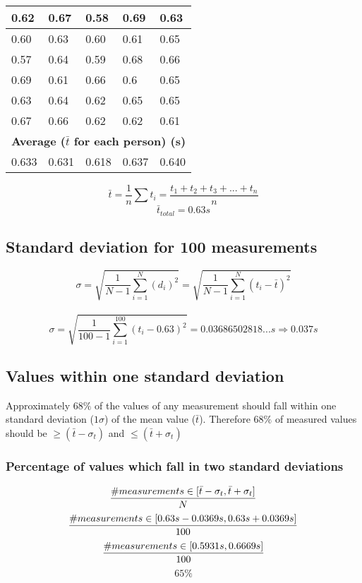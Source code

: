 \documentclass[11pt, letterpaper, includehead]{article}
\begin{document}
\begin{center}
\begin{tabular}{|  m{2cm} | m{2cm} | m{2cm} | m{2cm} | m{2cm} | }
    0.62          & 0.67           & 0.58         & 0.69           & 0.63          \\
    \hline
    0.60          & 0.63           & 0.60         & 0.61           & 0.65          \\
    \hline
    0.57          & 0.64           & 0.59         & 0.68           & 0.66          \\
    \hline
    0.69          & 0.61           & 0.66         & 0.6            & 0.65          \\
    \hline
    0.63          & 0.64           & 0.62         & 0.65           & 0.65          \\
    \hline
    0.67          & 0.66           & 0.62         & 0.62           & 0.61          \\
    \hline\hline
    \multicolumn{5}{|c|}{\textbf{Average ($\bar{t}$ for each person) (s)}} \\
    \hline
    0.633         & 0.631          & 0.618        & 0.637          & 0.640         \\
    \hline
  \end{tabular}
\end{center}
$$\bar{t} = \frac{1}{n}\sum t_i = \frac{t_1 + t_2 + t_3 + ... + t_n}{n}$$
$$\bar{t}_{total} = \boxed{0.63s}$$

\subsection{Standard deviation for 100 measurements} %
$$\sigma = \sqrt{\frac{1}{N - 1}\sum_{i = 1}^{N} (d_i)^2} = \sqrt{\frac{1}{N - 1}\sum_{i = 1}^{N} (t_i - \bar{t})^2}$$\\
$$\sigma = \sqrt{\frac{1}{100 - 1}\sum_{i = 1}^{100}(t_i - 0.63)^2} = 0.03686502818...s \Rightarrow \boxed{0.037s}$$

\subsection{Values within one standard deviation} %
Approximately $68\%$ of the values of any measurement should fall within one
standard deviation ($1 \sigma$) of the mean value ($\bar{t}$). Therefore $68\%$ of measured
values should be $\geq (\bar{t} - \sigma_t)$ and $\leq (\bar{t} + \sigma_t)$

\subsubsection{Percentage of values which fall in two standard deviations} %
$$\frac{\# measurements \in [\bar{t} - \sigma_t, \bar{t} + \sigma_t]}{N} \\$$
$$\frac{\# measurements \in [0.63s - 0.0369s, 0.63s + 0.0369s]}{100} \\$$
$$\frac{\# measurements \in [0.5931s, 0.6669s]}{100} \\$$
$$\boxed{65\%}$$
\end{document}
